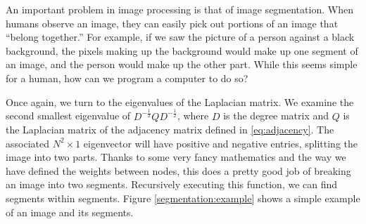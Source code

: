 An important problem in image processing is that of image segmentation.
When humans observe an image, they can easily pick out portions of an image that ``belong together.''
For example, if we saw the picture of a person against a black background, the pixels making up the background would make up one segment of an image, and the person would make up the other part.
While this seems simple for a human, how can we program a computer to do so?

Once again, we turn to the eigenvalues of the Laplacian matrix.
We examine the second smallest eigenvalue of $D^{-\frac{1}{2}}QD^{-\frac{1}{2}}$, where $D$ is the degree matrix and $Q$ is the Laplacian matrix of the adjacency matrix defined in \eqref{eq:adjacency}.
The associated $N^2 \times 1$ eigenvector will have positive and negative entries, splitting the image into two parts.
Thanks to some very fancy mathematics and the way we have defined the weights between nodes, this does a pretty good job of breaking an image into two segments.
Recursively executing this function, we can find segments within segments.
Figure \ref{segmentation:example} shows a simple example of an image and its segments.


